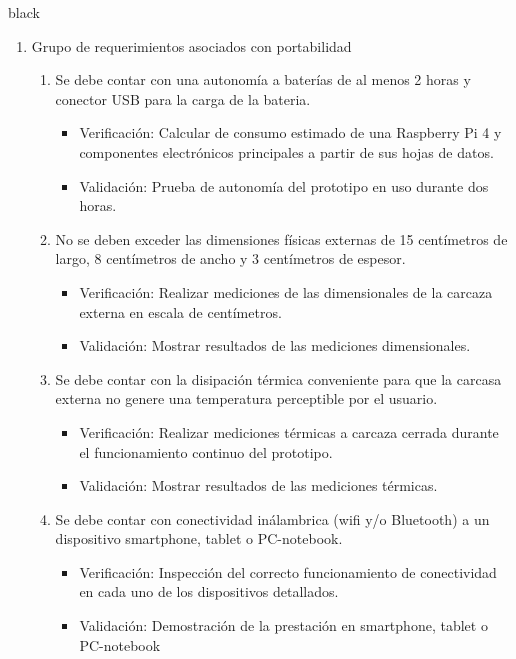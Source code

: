 \documentclass[11pt]{charter}
\begin{document}
\begin{consigna}{black}
\begin{enumerate}
\item Grupo de requerimientos asociados con portabilidad
	\begin{enumerate}
	\item Se debe contar con una autonomía a baterías de al menos 2 horas y conector USB para la carga de la bateria.
	\begin{itemize}
		\item Verificación: Calcular de consumo estimado de una Raspberry Pi 4 y componentes electrónicos principales a partir de sus hojas de datos.
		\item Validación: Prueba de autonomía del prototipo en uso durante dos horas.\\
	\end{itemize}
	\item No se deben exceder las dimensiones físicas externas de 15 centímetros de largo, 8 centímetros de ancho y 3 centímetros de espesor.
	\begin{itemize}
		\item Verificación: Realizar mediciones de las dimensionales de la carcaza externa en escala de centímetros.
		\item Validación: Mostrar resultados de las mediciones dimensionales.\\
	\end{itemize}
	\item Se debe contar con la disipación térmica conveniente para que la carcasa externa no genere una temperatura perceptible por el usuario.
	\begin{itemize}
		\item Verificación: Realizar mediciones térmicas a carcaza cerrada durante el funcionamiento continuo del prototipo.
		\item Validación: Mostrar resultados de las mediciones térmicas.\\
	\end{itemize}
	\item Se debe contar con conectividad inálambrica (wifi y/o Bluetooth) a un dispositivo smartphone, tablet o PC-notebook.
	\begin{itemize}
		\item Verificación: Inspección del correcto funcionamiento de conectividad en cada uno de los dispositivos detallados.
		\item Validación: Demostración de la prestación en smartphone, tablet o PC-notebook\\
	\end{itemize}
	\end{enumerate}
	
\end{enumerate}

\end{consigna}
\pagebreak
\end{document}
